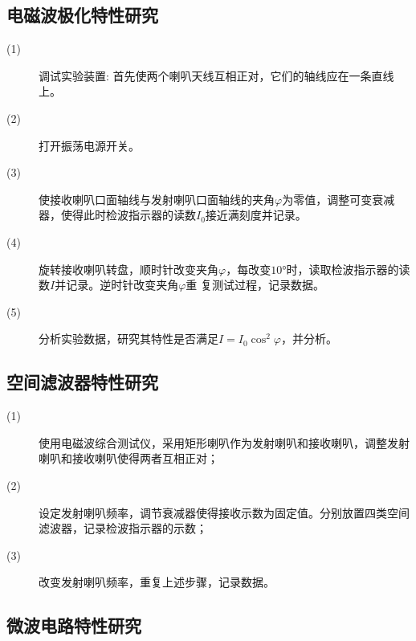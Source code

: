 \documentclass[UTF8]{ctexart}
\begin{document}
\subsection{电磁波极化特性研究}


\begin{description}
    \item[(1)] 调试实验装置: 首先使两个喇叭天线互相正对，它们的轴线应在一条直线上。
    
    \item[(2)] 打开振荡电源开关。
    
    \item[(3)] 使接收喇叭口面轴线与发射喇叭口面轴线的夹角$\varphi$为零值，调整可变衰减器，使得此时检波指示器的读数$I_0$接近满刻度并记录。
    
    \item[(4)] 旋转接收喇叭转盘，顺时针改变夹角$\varphi$，每改变$10°$时，读取检波指示器的读数$I$并记录。逆时针改变夹角$\varphi$重
    复测试过程，记录数据。
    
    \item[(5)] 分析实验数据，研究其特性是否满足$I=I_0\cos^2\varphi$，并分析。
\end{description}

\subsection{空间滤波器特性研究}


\begin{description}
    \item[(1)] 使用电磁波综合测试仪，采用矩形喇叭作为发射喇叭和接收喇叭，调整发射喇叭和接收喇叭使得两者互相正对；
    \item[(2)] 设定发射喇叭频率，调节衰减器使得接收示数为固定值。分别放置四类空间滤波器，记录检波指示器的示数；
    \item[(3)] 改变发射喇叭频率，重复上述步骤，记录数据。
\end{description}


\subsection{微波电路特性研究}
\end{document}
